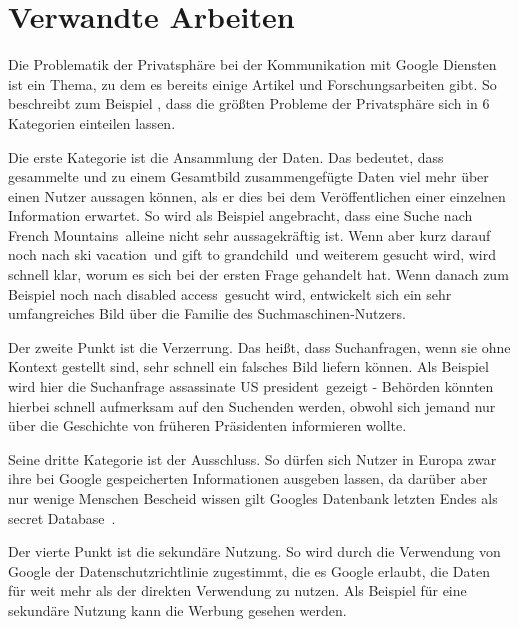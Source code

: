 % 
% 

\chapter{Verwandte Arbeiten}
Die Problematik der Privatsphäre bei der Kommunikation mit Google Diensten ist ein Thema, zu dem es bereits einige Artikel und Forschungsarbeiten gibt. So beschreibt zum Beispiel \citet{tene2007google}, dass die größten Probleme der Privatsphäre sich in 6 Kategorien einteilen lassen.

Die erste Kategorie ist die Ansammlung der Daten. Das bedeutet, dass gesammelte und zu einem Gesamtbild zusammengefügte Daten viel mehr über einen Nutzer aussagen können, als er dies bei dem Veröffentlichen einer einzelnen Information erwartet. So wird als Beispiel angebracht, dass eine Suche nach \glqq French Mountains\grqq\ alleine nicht sehr aussagekräftig ist. Wenn aber kurz darauf noch nach \glqq ski vacation\grqq\ und \glqq gift to grandchild\grqq\ und weiterem gesucht wird, wird schnell klar, worum es sich bei der ersten Frage gehandelt hat. Wenn danach zum Beispiel noch nach \glqq disabled access\grqq\ gesucht wird, entwickelt sich ein sehr umfangreiches Bild über die Familie des Suchmaschinen-Nutzers. 

Der zweite Punkt ist die Verzerrung. Das heißt, dass Suchanfragen, wenn sie ohne Kontext gestellt sind, sehr schnell ein falsches Bild liefern können. Als Beispiel wird hier die Suchanfrage \glqq assassinate US president\grqq\ gezeigt - Behörden könnten hierbei schnell aufmerksam auf den Suchenden werden, obwohl sich jemand nur über die Geschichte von früheren Präsidenten informieren wollte.

Seine dritte Kategorie ist der Ausschluss. So dürfen sich Nutzer in Europa zwar ihre bei Google gespeicherten Informationen ausgeben lassen, da darüber aber nur wenige Menschen Bescheid wissen gilt Googles Datenbank letzten Endes als \glqq secret Database\grqq\ . 

Der vierte Punkt ist die \glqq sekundäre Nutzung\grqq . So wird durch die Verwendung von Google der Datenschutzrichtlinie zugestimmt, die es Google erlaubt, die Daten für weit mehr als der direkten Verwendung zu nutzen. Als Beispiel für eine sekundäre Nutzung kann die Werbung gesehen werden. 


